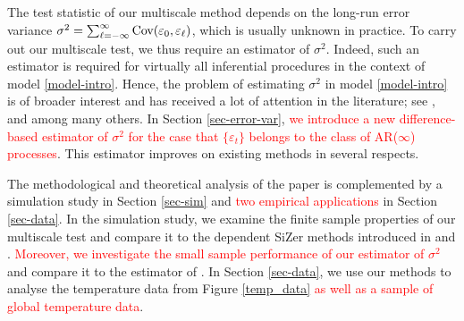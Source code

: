 The test statistic of our multiscale method depends on the long-run error variance $\sigma^2 = \sum\nolimits_{\ell=-\infty}^{\infty} \textnormal{Cov}(\varepsilon_0,\varepsilon_{\ell})$, which is usually unknown in practice. To carry out our multiscale test, we thus require an estimator of $\sigma^2$. Indeed, such an estimator is required for virtually all inferential procedures in the context of model \eqref{model-intro}. Hence, the problem of estimating $\sigma^2$ in model \eqref{model-intro} is of broader interest and has received a lot of attention in the literature; see \cite{MuellerStadtmueller1988}, \cite{Herrmann1992} and \cite{Hall2003} among many others. In Section \ref{sec-error-var}, 
\textcolor{red}{we introduce a new difference-based estimator of $\sigma^2$ for the case that $\{ \varepsilon_t \}$ belongs to the class of AR($\infty$) processes}. This estimator improves on existing methods in several respects. 


The methodological and theoretical analysis of the paper is complemented by a simulation study in Section \ref{sec-sim} and \textcolor{red}{two empirical applications} in Section \ref{sec-data}. In the simulation study, we examine the finite sample properties of our multiscale test and compare it to the dependent SiZer methods introduced in \cite{Rondonotti2004} and \cite{Rondonotti2007}. \textcolor{red}{Moreover, we investigate the small sample performance of our estimator of $\sigma^2$} and compare it to the estimator of \cite{Hall2003}. In Section \ref{sec-data}, we use our methods to analyse the temperature data from Figure \ref{temp_data} \textcolor{red}{as well as a sample of global temperature data}. 


